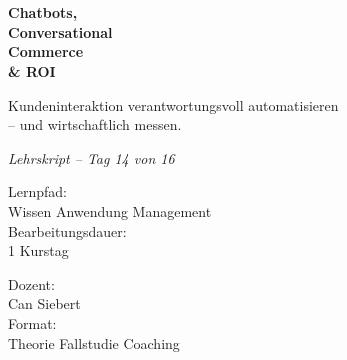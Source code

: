 \documentclass[11pt,a4paper,oneside]{article}
\newcommand{\caveatfontfallback}{\itshape}
\newcommand\caveatfont{\caveatfontfallback}%
\begin{document}
\begin{titlepage}
  \pagestyle{empty}
  \vspace*{1.5cm}
  \\[2pt]
  \noindent{\color{lpAccent}\rule{\linewidth}{1.2pt}}\\[4pt]

  \vspace{3cm}
  {\sffamily\fontsize{30}{34}\selectfont\bfseries\color{lpInk}Chatbots,\\Conversational\\Commerce\\\& ROI\par}

  \vspace{0.7cm}
  {\sffamily\large\color{lpGray}Kundeninteraktion verantwortungsvoll automatisieren\\-- und wirtschaftlich messen.\par}

  \vspace{1.5cm}
  {\caveatfont\LARGE\color{lpAmber}Lehrskript -- Tag 14 von 16}\par

  \vfill

  \noindent\begin{minipage}{0.55\linewidth}
    {\sffamily\footnotesize\color{lpGray}Lernpfad:}\\
    {\sffamily\small\color{lpInk}Wissen \textrightarrow{} Anwendung \textrightarrow{} Management}\\[10pt]
    {\sffamily\footnotesize\color{lpGray}Bearbeitungsdauer:}\\
    {\sffamily\small\color{lpInk}1 Kurstag}
  \end{minipage}\hfill
  \begin{minipage}{0.4\linewidth}
    \raggedleft
    {\sffamily\footnotesize\color{lpGray}Dozent:}\\
    {\sffamily\small\color{lpInk}Can Siebert}\\[10pt]
    {\sffamily\footnotesize\color{lpGray}Format:}\\
    {\sffamily\small\color{lpInk}Theorie \textperiodcentered{} Fallstudie \textperiodcentered{} Coaching}
  \end{minipage}

  \vspace{0.5cm}
  \noindent{\color{lpAccent}\rule{\linewidth}{0.6pt}}
\end{titlepage}
\end{document}
